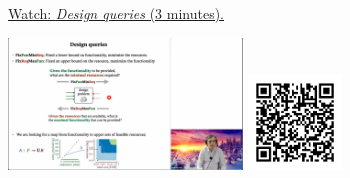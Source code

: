 
\begin{minipage}{10cm}
    \href{https://act4e-spring21.netlify.app/videos/spring2021-design:design:queries.html}{Watch: \emph{Design queries} (3 minutes).}
        
    \href{https://act4e-spring21.netlify.app/videos/spring2021-design:design:queries.html}{\includegraphics[height=3.5cm]{spring2021-design:design:queries/thumbnails.jpg}}
    \href{https://act4e-spring21.netlify.app/videos/spring2021-design:design:queries.html}{\includegraphics[height=2.5cm]{spring2021-design:design:queries/qrcode.png}}
\end{minipage}
